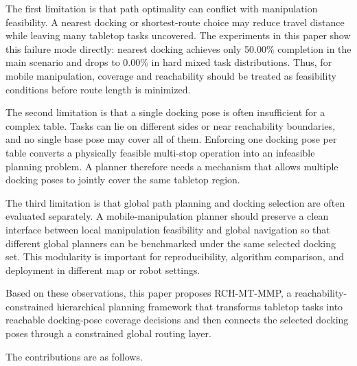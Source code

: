The first limitation is that path optimality can conflict with manipulation feasibility. A nearest docking or shortest-route choice may reduce travel distance while leaving many tabletop tasks uncovered. The experiments in this paper show this failure mode directly: nearest docking achieves only 50.00\% completion in the main scenario and drops to 0.00\% in hard mixed task distributions. Thus, for mobile manipulation, coverage and reachability should be treated as feasibility conditions before route length is minimized.

The second limitation is that a single docking pose is often insufficient for a complex table. Tasks can lie on different sides or near reachability boundaries, and no single base pose may cover all of them. Enforcing one docking pose per table converts a physically feasible multi-stop operation into an infeasible planning problem. A planner therefore needs a mechanism that allows multiple docking poses to jointly cover the same tabletop region.

The third limitation is that global path planning and docking selection are often evaluated separately. A mobile-manipulation planner should preserve a clean interface between local manipulation feasibility and global navigation so that different global planners can be benchmarked under the same selected docking set. This modularity is important for reproducibility, algorithm comparison, and deployment in different map or robot settings.

Based on these observations, this paper proposes RCH-MT-MMP, a reachability-constrained hierarchical planning framework that transforms tabletop tasks into reachable docking-pose coverage decisions and then connects the selected docking poses through a constrained global routing layer.

The contributions are as follows.

